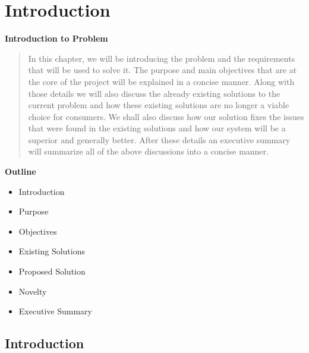 \section{Introduction}

\vspace{20mm}

\Huge{\textbf{Introduction to Problem}}

\vspace{20mm}


\begin{abstract}
	In this chapter, we will be introducing the problem and the requirements that will be used to solve it. The purpose and main objectives that are at the core of the project will be explained in a concise manner. Along with those details we will also discuss the already existing solutions to the current problem and how these existing solutions are no longer a viable choice for consumers. We shall also discuss how our solution fixes the issues that were found in the existing solutions and how our system will be a superior and generally better. After these details an executive summary will summarize all of the above discussions into a concise manner.
\end{abstract}

\vspace{20mm}






\large{\textbf{Outline}}

\begin{center}
	\begin{itemize}
		\item Introduction
		\item Purpose
		\item Objectives
		\item Existing Solutions
		\item Proposed Solution
		\item Novelty
		\item Executive Summary
	\end{itemize}
\end{center}
\pagebreak








\subsection{Introduction}


